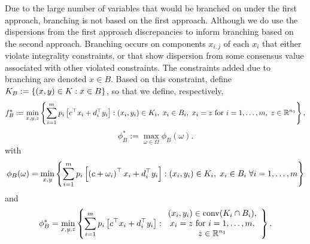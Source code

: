 Due to the large number of variables that would be branched on under the first approach, branching is not based on the first approach. Although we do use the dispersions from the first approach discrepancies to inform branching based on the second approach. 
Branching occurs on components $x_{i,j}$ of each $x_i$ that either violate integrality constraints, or that show dispersion from some consensus value associated with other violated constraints.
The constraints added due to branching are denoted $x \in B$. Based on this constraint, define $K_B:=\left\{ (x,y) \in K : x \in B \right \}$, so that we define, respectively,
\begin{equation}\label{P1B}
f_B^*:=\min_{x,y,z} \left\{ \sum_{i=1}^m p_i \left[ c^\top x_i + d_i^\top y_i \right] : (x_i,y_i) \in K_i,\; x_i \in B_i,\;  x_i=z \text{ for }i=1,\dots,m,\; z \in \mathbb{R}^{n_1} \right \},
\end{equation}
\begin{equation}\label{D1B}
\phi_{B}^*:=\max_{\omega \in \Omega} \phi_B(\omega).
\end{equation}
with
\begin{equation}\label{PhiCB}
\phi_B(\omega) = \min_{x,y} \left\{  \sum_{i=1}^m p_i \left[ \left(c+\omega_i\right)^\top x_i + d_i^\top y_i \right] : (x_i,y_i) \in K_i,\; x_i \in B_i \; \forall i=1,\dots,m \right \}
\end{equation} 
and
\begin{equation}\label{D2B}
\phi_{B}^*=\min_{x,y,z} \left\{ \sum_{i=1}^m p_i \left[ c^\top x_i + d_i^\top y_i \right] : \begin{array}{c}(x_i,y_i) \in \operatorname{conv}(K_i \cap B_i),\\  x_i=z \text{ for }i=1,\dots,m,\\ z \in \mathbb{R}^{n_1}\end{array} \right \}.
\end{equation}




